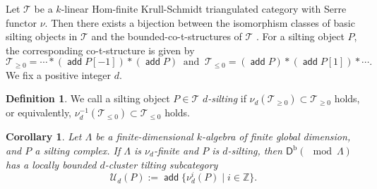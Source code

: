 \documentclass[a4paper,reqno,11pt]{amsart}
\newtheorem{corollary}[theorem]{Corollary}
\theoremstyle{definition}
\newtheorem{definition}[theorem]{Definition}
\newcommand{\DDD}{\mathsf{D}}
\newcommand{\TT}{\mathcal{T}}
\newcommand{\UU}{\mathcal{U}}
\newcommand{\Z}{\mathbb{Z}}
\newcommand{\bo}{\operatorname{b}\nolimits}
\DeclareMathOperator{\add}{\mathsf{add}}
\newcommand{\new}[1]{{\blue #1}}
\numberwithin{equation}{section}
\begin{document}
\new{
Let $\TT$ be a $k$-linear Hom-finite Krull-Schmidt triangulated category with Serre functor $\nu$. 
Then there exists a bijection between the isomorphism classes of basic silting objects in $\TT$ and the bounded-co-t-structures of $\TT$ \cite{KY}. For a silting object $P$, the corresponding co-t-structure is given by
\[\TT_{\ge0}=\cdots*(\add P[-1])*(\add P)\ \mbox{ and }\ \TT_{\le0}=(\add P)*(\add P[1])*\cdots.\]
We fix a positive integer $d$. 

\begin{definition}
We call a silting object $P\in\TT$ \emph{$d$-silting} if $\nu_d(\TT_{\ge0})\subset\TT_{\ge0}$ holds, or equivalently, $\nu_d^{-1}(\TT_{\le0})\subset\TT_{\le0}$ holds.
\end{definition}

\begin{corollary}\label{from silting to cluster tilting}
Let $\Lambda$ be a finite-dimensional $k$-algebra of finite global dimension, and $P$ a silting complex.
If $\Lambda$ is $\nu_d$-finite and $P$ is $d$-silting, then $\DDD^{\bo}(\mod\Lambda)$ has a locally bounded $d$-cluster tilting subcategory
\[\UU_d(P):=\add\{\nu_d^i(P)\mid i\in\Z\}.\]
\end{corollary}
}
\end{document}
